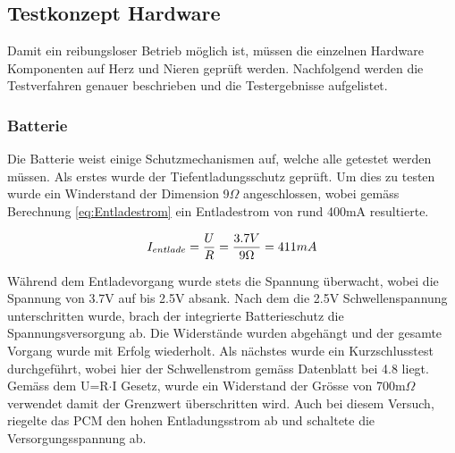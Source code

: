 \subsection{Testkonzept Hardware}\label{sec:testkonzeptHardware}
Damit ein reibungsloser Betrieb möglich ist, müssen die einzelnen Hardware Komponenten auf Herz und Nieren geprüft werden. Nachfolgend werden die Testverfahren genauer beschrieben und die Testergebnisse aufgelistet.

\subsubsection{Batterie}\label{sec:batterie}
Die Batterie weist einige Schutzmechanismen auf, welche alle getestet werden müssen. Als erstes wurde der Tiefentladungsschutz geprüft. Um dies zu testen wurde ein Winderstand der Dimension 9$\Omega$ angeschlossen, wobei gemäss Berechnung \ref{eq:Entladestrom} ein Entladestrom von rund 400mA resultierte.

\begin{equation}
\centering
I_{entlade}=\frac{U}{R}=\frac{3.7V}{9\Omega }= 411mA
\label{eq:Entladestrom}
\end{equation}

Während dem Entladevorgang wurde stets die Spannung überwacht, wobei die Spannung von 3.7V auf bis 2.5V absank. Nach dem die 2.5V Schwellenspannung unterschritten wurde, brach der integrierte Batterieschutz die Spannungsversorgung ab. Die Widerstände wurden abgehängt und der gesamte Vorgang wurde mit Erfolg wiederholt.
\newline
Als nächstes wurde ein Kurzschlusstest durchgeführt, wobei hier der Schwellenstrom gemäss Datenblatt bei 4.8 liegt. Gemäss dem U=R$\cdot$I Gesetz, wurde ein Widerstand der Grösse von 700m$\Omega$ verwendet damit der Grenzwert überschritten wird. Auch bei diesem Versuch, riegelte das PCM den hohen Entladungsstrom ab und schaltete die Versorgungsspannung ab.


